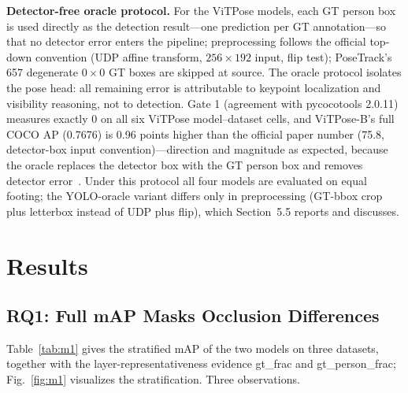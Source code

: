 \documentclass[10pt,conference]{IEEEtran}
\begin{document}
\textbf{Detector-free oracle protocol.} For the ViTPose models, each GT person box is used directly as the detection result---one prediction per GT annotation---so that no detector error enters the pipeline; preprocessing follows the official top-down convention (UDP affine transform, $256\times192$ input, flip test); PoseTrack's 657 degenerate $0\times0$ GT boxes are skipped at source. The oracle protocol isolates the pose head: all remaining error is attributable to keypoint localization and visibility reasoning, not to detection. Gate 1 (agreement with pycocotools 2.0.11) measures exactly 0 on all six ViTPose model--dataset cells, and ViTPose-B's full COCO AP (0.7676) is 0.96 points higher than the official paper number (75.8, detector-box input convention)---direction and magnitude as expected, because the oracle replaces the detector box with the GT person box and removes detector error~\cite{17}. Under this protocol all four models are evaluated on equal footing; the YOLO-oracle variant differs only in preprocessing (GT-bbox crop plus letterbox instead of UDP plus flip), which Section~5.5 reports and discusses.

\section{Results}

\subsection{RQ1: Full mAP Masks Occlusion Differences}

Table~\ref{tab:m1} gives the stratified mAP of the two models on three datasets, together with the layer-representativeness evidence gt\_frac and gt\_person\_frac; Fig.~\ref{fig:m1} visualizes the stratification. Three observations.
\end{document}
